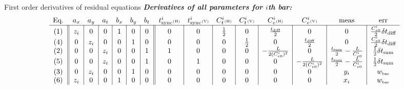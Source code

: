 \documentclass{ikpKoeln}
\newcommand{\espeed}{C^i_e}
\newcommand{\espeedi}{C^i_{e0}}
\newcommand{\tspeed}{C^i_t}
\newcommand{\tsync}{t^i_{\text{sync}}}
\begin{document}
\begin{frame}{First order derivatives of residual equations}
	\setlength\arraycolsep{1pt}
	\renewcommand{\arraystretch}{1.}
	\flushleft \textbf{\textit{Derivatives of all parameters for $i$th bar:}}
	$$
		\begin{array}{c||c|c|c|c|c|c||c|c|c|c|c|c|c|c}
			\text{Eq.} & a_x & a_y & a_t & b_x & b_y & b_t & \tsync\text{\tiny(H)} & \tsync\text{\tiny(V)} & \tspeed \text{\tiny(H)} & \tspeed \text{\tiny(V)} & \espeed \text{\tiny(H)}   & \espeed  \text{\tiny(V)}  & \text{meas}                                 & \text{err}                             \\ \hline
			\text{(1)} & z_i & 0   & 0   & 1   & 0   & 0   & 0                     & 0                     & \frac{1}{2}             & 0                       & \frac{t_\text{diff}}{2}   & 0                         & 0                                           & \frac{\espeedi}{2}\delta t_\text{diff} \\
			\text{(4)} & 0   & z_i & 0   & 0   & 1   & 0   & 0                     & 0                     & 0                       & \frac{1}{2}             & 0                         & \frac{t_\text{diff}}{2}   & 0                                           & \frac{\espeedi}{2}\delta t_\text{diff} \\
			\text{(2)} & 0   & 0   & z_i & 0   & 0   & 1   & 1                     & 0                     & 0                       & 0                       & -\frac{L}{2 (\espeedi)^2} & 0                         & \frac{t_{\text{sum}}}{2}-\frac{L}{\espeedi} & \frac{1}{2}\delta t_{\text{sum}}       \\
			\text{(5)} & 0   & 0   & z_i & 0   & 0   & 1   & 0                     & 1                     & 0                       & 0                       & 0                         & -\frac{L}{2 (\espeedi)^2} & \frac{t_{\text{sum}}}{2}-\frac{L}{\espeedi} & \frac{1}{2}\delta t_{\text{sum}}       \\
			\text{(3)} & 0   & z_i & 0   & 0   & 1   & 0   & 0                     & 0                     & 0                       & 0                       & 0                         & 0                         & y_i                                         & w_{\text{\tiny bar}}                   \\
			\text{(6)} & z_i & 0   & 0   & 1   & 0   & 0   & 0                     & 0                     & 0                       & 0                       & 0                         & 0                         & x_i                                         & w_{\text{\tiny bar}}                   \\
		\end{array}
	$$


\end{frame}
\end{document}
